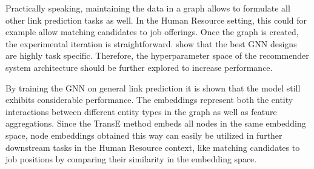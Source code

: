 Practically speaking, maintaining the data in a graph allows to formulate all other link prediction tasks as well. In the Human Resource setting, this could for example allow matching candidates to job offerings. Once the graph is created, the experimental iteration is straightforward. \textcite{you2020design} show that the best GNN designs are highly task specific. Therefore, the hyperparameter space of the recommender system architecture should be further explored to increase performance. 

By training the GNN on general link prediction it is shown that the model still exhibits considerable performance. The embeddings represent both the entity interactions between different entity types in the graph as well as feature aggregations. Since the TransE method embeds all nodes in the same embedding space, node embeddings obtained this way can easily be utilized in further downstream tasks in the Human Resource context, like matching candidates to job positions by comparing their similarity in the embedding space. 






